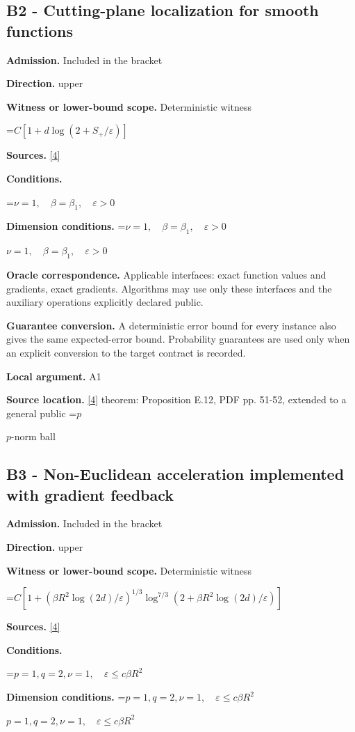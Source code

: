 \documentclass[10pt,a4paper]{article}
\newcommand{\AtlasMath}[1]{\par\begingroup\centering\setbox0=\hbox{$\displaystyle #1$}\ifdim\wd0>1.4\linewidth\typeout{ATLAS WIDE FORMULA: \the\wd0}\fi\ifdim\wd0>\linewidth\resizebox{\linewidth}{!}{\box0}\else\box0\fi\par\endgroup}
\newcommand{\AtlasInlineMath}[1]{\begingroup\setbox0=\hbox{$#1$}\ifdim\wd0>.4\linewidth\endgroup\AtlasMath{#1}\else\endgroup$#1$\fi}
\begin{document}
\subsection{B2 - Cutting-plane localization for smooth functions}
\textbf{Admission.} Included in the bracket

\textbf{Direction.} upper

\textbf{Witness or lower-bound scope.} Deterministic witness

\AtlasMath{C[1+d\log(2+S_+/\varepsilon)]}
\textbf{Sources.} \href{https://arxiv.org/pdf/2609.32910}{[4]}

\textbf{Conditions.} 
\AtlasMath{\nu=1,\quad\beta=\beta_1,\quad\varepsilon>0}


\textbf{Dimension conditions.} \AtlasInlineMath{\nu=1,\quad\beta=\beta_1,\quad\varepsilon>0}

\textbf{Oracle correspondence.} Applicable interfaces: exact function values and gradients, exact gradients. Algorithms may use only these interfaces and the auxiliary operations explicitly declared public.

\textbf{Guarantee conversion.} A deterministic error bound for every instance also gives the same expected-error bound. Probability guarantees are used only when an explicit conversion to the target contract is recorded.

\textbf{Local argument.} A1

\textbf{Source location.} \href{https://arxiv.org/pdf/2609.32910}{[4]} theorem: Proposition E.12, PDF pp. 51-52, extended to a general public \AtlasInlineMath{p}-norm ball

\subsection{B3 - Non-Euclidean acceleration implemented with gradient feedback}
\textbf{Admission.} Included in the bracket

\textbf{Direction.} upper

\textbf{Witness or lower-bound scope.} Deterministic witness

\AtlasMath{C[1+(\beta R^2\log(2d)/\varepsilon)^{1/3}\log^{7/3}(2+\beta R^2\log(2d)/\varepsilon)]}
\textbf{Sources.} \href{https://arxiv.org/pdf/2609.32910}{[4]}

\textbf{Conditions.} 
\AtlasMath{p=1,q=2,\nu=1,\quad\varepsilon\le c\beta R^2}


\textbf{Dimension conditions.} \AtlasInlineMath{p=1,q=2,\nu=1,\quad\varepsilon\le c\beta R^2}
\end{document}
